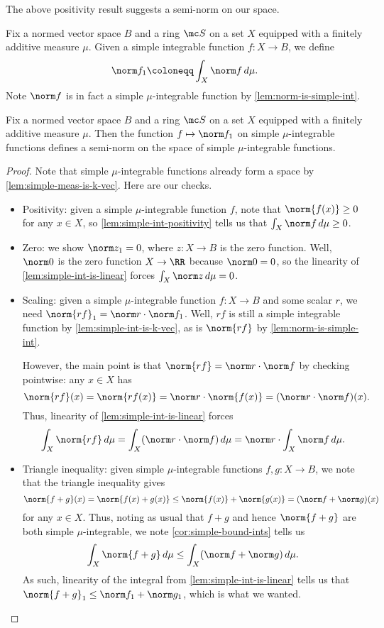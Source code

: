 \documentclass[../notes.tex]{subfiles}
\begin{document}
The above positivity result suggests a semi-norm on our space.
\begin{notation}
	Fix a normed vector space $B$ and a ring $\mc S$ on a set $X$ equipped with a finitely additive measure $\mu$. Given a simple integrable function $f\colon X\to B$, we define
	\[\norm f_1\coloneqq\int_X\norm f\,d\mu.\]
	Note $\norm f$ is in fact a simple $\mu$-integrable function by \autoref{lem:norm-is-simple-int}.
\end{notation}
\begin{lemma} \label{lem:l1-seminorm}
	Fix a normed vector space $B$ and a ring $\mc S$ on a set $X$ equipped with a finitely additive measure $\mu$. Then the function $f\mapsto\norm f_1$ on simple $\mu$-integrable functions defines a semi-norm on the space of simple $\mu$-integrable functions.
\end{lemma}
\begin{proof}
	Note that simple $\mu$-integrable functions already form a space by \autoref{lem:simple-meas-is-k-vec}. Here are our checks.
	\begin{itemize}
		\item Positivity: given a simple $\mu$-integrable function $f$, note that $\norm{f(x)}\ge0$ for any $x\in X$, so \autoref{lem:simple-int-positivity} tells us that $\int_X\norm f\,d\mu\ge0$.
		\item Zero: we show $\norm z_1=0$, where $z\colon X\to B$ is the zero function. Well, $\norm0$ is the zero function $X\to\RR$ because $\norm0=0$, so the linearity of \autoref{lem:simple-int-is-linear} forces $\int_X\norm z\,d\mu=0$.
		\item Scaling: given a simple $\mu$-integrable function $f\colon X\to B$ and some scalar $r$, we need $\norm{rf}_1=\norm r\cdot\norm f_1$. Well, $rf$ is still a simple integrable function by \autoref{lem:simple-int-is-k-vec}, as is $\norm{rf}$ by \autoref{lem:norm-is-simple-int}.

		However, the main point is that $\norm{rf}=\norm r\cdot\norm f$ by checking pointwise: any $x\in X$ has
		\[\norm{rf}(x)=\norm{rf(x)}=\norm r\cdot\norm{f(x)}=(\norm r\cdot\norm f)(x).\]
		Thus, linearity of \autoref{lem:simple-int-is-linear} forces
		\[\int_X\norm{rf}\,d\mu=\int_X(\norm r\cdot\norm f)\,d\mu=\norm r\cdot\int_X\norm f\,d\mu.\]
		\item Triangle inequality: given simple $\mu$-integrable functions $f,g\colon X\to B$, we note that the triangle inequality gives
		\[\norm{f+g}(x)=\norm{f(x)+g(x)}\le\norm{f(x)}+\norm{g(x)}=(\norm f+\norm g)(x)\]
		for any $x\in X$. Thus, noting as usual that $f+g$ and hence $\norm{f+g}$ are both simple $\mu$-integrable, we note \autoref{cor:simple-bound-ints} tells us
		\[\int_X\norm{f+g}\,d\mu\le\int_X(\norm f+\norm g)\,d\mu.\]
		As such, linearity of the integral from \autoref{lem:simple-int-is-linear} tells us that $\norm{f+g}_1\le\norm f_1+\norm g_1$, which is what we wanted.
		\qedhere
	\end{itemize}
\end{proof}
\end{document}
